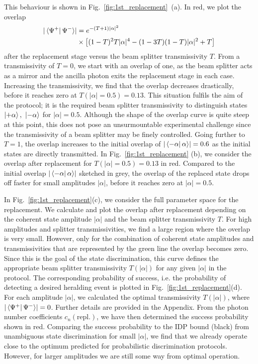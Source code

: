 \documentclass[aps,prl,twocolumn, superscriptaddress]{revtex4-1}
\begin{document}
This behaviour is shown in Fig.~\ref{fig:1st_replacement}~(a). In red, we plot the overlap
%
\begin{equation}
\nonumber
\begin{aligned}
|\bra{\Psi^+}\Psi^-\rangle| &= e^{-(T+1)|\alpha|^2}\\
&\times\left[(1-T)^2T|\alpha|^4-(1-3T)(1-T)|\alpha|^2+T\right]
\end{aligned}
\label{eq:overlap}
\end{equation}
%
after the replacement stage versus the beam splitter transmissivity $T$. From a transmissivity of $T=0$, we start with an overlap of one, as the beam splitter acts as a mirror and the ancilla photon exits the replacement stage in each case. Increasing the transmissivity, we find that the overlap decreases drastically, before it reaches zero at $T(|\alpha|=0.5)=0.13$. This situation fulfils the aim of the protocol; it is the required beam splitter transmissivity to distinguish states $\ket{+\alpha},~\ket{-\alpha}$ for $|\alpha|=0.5$. Although the shape of the overlap curve is quite steep at this point, this does not pose an unsurmountable experimental challenge since the transmissivity of a beam splitter may be finely controlled.
Going further to $T=1$, the overlap increases to the initial overlap of $|\bra{-\alpha}\alpha\rangle|=0.6$ as the initial states are directly transmitted. In Fig.~\ref{fig:1st_replacement} (b), we consider the overlap after replacement for $T(|\alpha|=0.5)=0.13$ in red. Compared to the initial overlap $|\bra{-\alpha}\alpha\rangle|$ sketched in grey, the overlap of the replaced state drops off faster for small amplitudes $|\alpha|$, before it reaches zero at $|\alpha|=0.5$.

In Fig.~\ref{fig:1st_replacement}(c), we consider the full parameter space for the replacement. We calculate and plot the overlap after replacement depending on the coherent state amplitude $|\alpha|$ and the beam splitter transmissivity $T$. For high amplitudes and splitter transmissivities, we find a large region where the overlap is very small. However, only for the combination of coherent state amplitudes and transmissivities that are represented by the green line the overlap becomes zero. Since this is the goal of the state discrimination, this curve defines the appropriate beam splitter transmissivity $T(|\alpha|)$ for any given $|\alpha|$ in the protocol.
The corresponding probability of success, i.e. the probability of detecting a desired heralding event is plotted in Fig.~\ref{fig:1st_replacement}(d). For each amplitude $|\alpha|$, we calculated the optimal transmissivity $T(|\alpha|)$, where $|\bra{\Psi^+}\Psi^-\rangle|=0$. Further details are provided in the Appendix. From the photon number coefficients $c_n(\mathrm{repl.})$, we have then determined the success probability shown in red. Comparing the success probability to the IDP bound (black) from unambiguous state discrimination for small $|\alpha|$, we find that we already operate close to the optimum predicted for probabilistic discrimination protocols. However, for larger amplitudes we are still some way from optimal operation.
\end{document}
